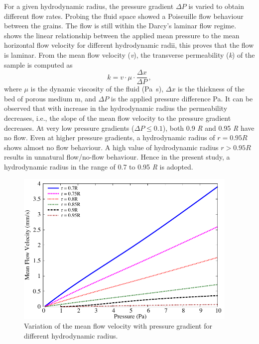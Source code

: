 For a given hydrodynamic radius, the pressure gradient $\Delta P$ is varied to 
obtain different flow rates. Probing the fluid space showed a Poiseuille flow 
behaviour between the grains. The flow is still within the Darcy's laminar flow 
regime.~ shows the linear relationship between the 
applied mean pressure to the mean horizontal flow velocity for different 
hydrodynamic radii, this proves that the flow is laminar. From the mean flow 
velocity (\textit{v}), the transverse permeability (\textit{k}) of the sample 
is computed as
%
\begin{equation}
k=v\cdot\mu\cdot\frac{\Delta x}{\Delta P} \,,
\end{equation}
%
where $\mu$ is the dynamic viscosity of the fluid (\si{\Pa\s}), $\Delta x$ is 
the thickness of the bed of porous medium \si{\m}, and $\Delta P$ is the 
applied pressure difference \si{\Pa}. It can be observed that with increase in 
the hydrodynamic radius the permeability decreases, i.e., the slope of the mean 
flow velocity to the pressure gradient decreases. At very low pressure 
gradients 
($\Delta P \le 0.1$), both 0.9 \textit{R} and 0.95 \textit{R} have no flow. 
Even at 
higher pressure gradients, a hydrodynamic radius of $r = 0.95 R$ shows almost 
no 
flow behaviour. A high value of hydrodynamic radius $r > 0.95 R$ 
results in unnatural flow/no-flow behaviour. Hence in the present study, a 
hydrodynamic radius in the range of 0.7 to 0.95 \textit{R} is adopted.

\begin{figure}[htpb]
\centering
\includegraphics[width=0.95\textwidth]{Permeability}
\caption{Variation of the mean flow velocity with pressure gradient for 
different hydrodynamic radius.}
\label{fig:permeability}
\end{figure}


